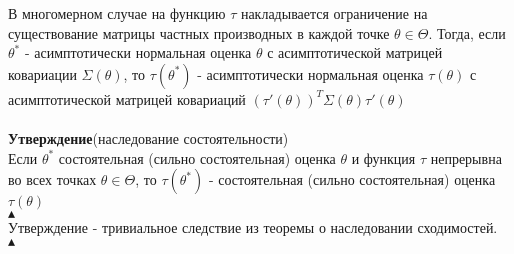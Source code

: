 \documentclass[25pt]{article}
\begin{document}
В многомерном случае на функцию $\tau$ накладывается ограничение на существование матрицы частных производных в каждой точке $\theta \in \Theta$. Тогда, если $\theta^*$ - асимптотически нормальная оценка $\theta$ с асимптотической матрицей ковариации $\Sigma(\theta)$, то
$\tau(\theta^*)$ - асимптотически нормальная оценка $\tau(\theta)$ с асимптотической матрицей ковариаций $(\tau'(\theta))^T\Sigma(\theta)\tau'(\theta)$
\\
\\
\textbf{Утверждение}(наследование состоятельности)\\
Если $\theta^*$ состоятельная (сильно состоятельная) оценка $\theta$ и функция $\tau$ непрерывна во всех точках $\theta \in \Theta$, то $\tau(\theta^*)$ - состоятельная (сильно состоятельная) оценка $\tau(\theta)$
\\
$\blacktriangle$
\\
Утверждение - тривиальное следствие из теоремы о наследовании сходимостей.
\\
$\blacktriangle$
\\
\end{document}
